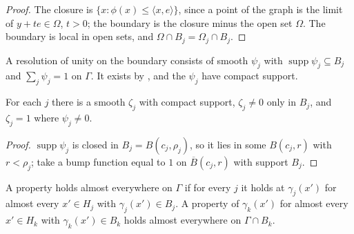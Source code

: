 \begin{proof}
\leanok
The closure is $\{x : \phi(x) \leq \langle x, e \rangle\}$, since a point of the graph is the limit
of $y + te \in \Omega$, $t > 0$; the boundary is the closure minus the open set $\Omega$. The
boundary is local in open sets, and $\Omega \cap B_j = \Omega_j \cap B_j$.
\end{proof}

\begin{definition}
\label{def:boundary-partition}
\leanok
{}
A resolution of unity on the boundary consists of smooth $\psi_j$ with
$\operatorname{supp} \psi_j \subseteq B_j$ and $\sum_j \psi_j = 1$ on $\Gamma$. It exists by
, and the $\psi_j$ have compact support.
\end{definition}

\begin{lemma}
\label{lem:boundary-cutoffs}
\leanok
{}
For each $j$ there is a smooth $\zeta_j$ with compact support, $\zeta_j \neq 0$ only in $B_j$, and
$\zeta_j = 1$ where $\psi_j \neq 0$.
\end{lemma}

\begin{proof}
\leanok
$\operatorname{supp} \psi_j$ is closed in $B_j = B(c_j, \rho_j)$, so it lies in some $B(c_j, r)$ with
$r < \rho_j$; take a bump function equal to $1$ on $\overline{B}(c_j, r)$ with support $B_j$.
\end{proof}

\begin{definition}
\label{def:ae-boundary}
\leanok
{}
A property holds almost everywhere on $\Gamma$ if for every $j$ it holds at $\gamma_j(x')$ for almost
every $x' \in H_j$ with $\gamma_j(x') \in B_j$. A property of $\gamma_k(x')$ for almost every
$x' \in H_k$ with $\gamma_k(x') \in B_k$ holds almost everywhere on $\Gamma \cap B_k$.
\end{definition}

